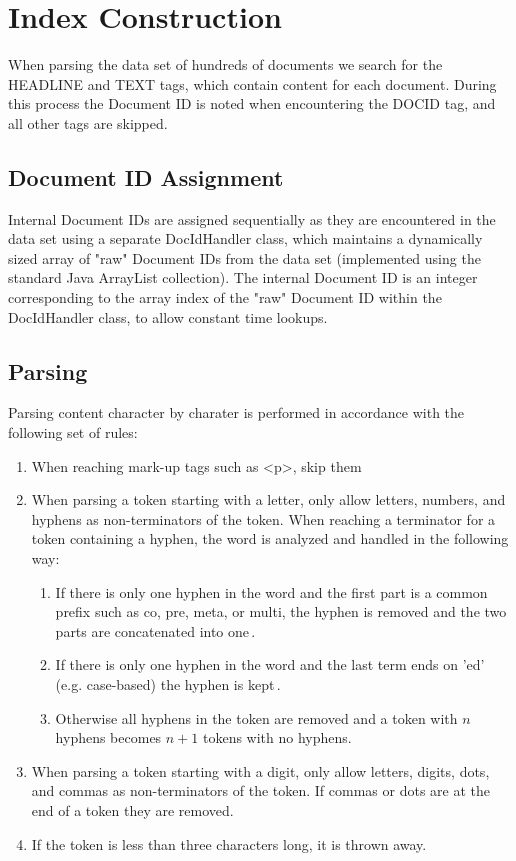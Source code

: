 
\section{Index Construction}
\label{sec:indexing}
When parsing the data set of hundreds of documents we search for the HEADLINE and TEXT tags, which contain content for each document. During this process the Document ID is noted when encountering the DOCID tag, and all other tags are skipped.

\subsection*{Document ID Assignment}

Internal Document IDs are assigned sequentially as they are encountered in the data set using a separate DocIdHandler class, which maintains a dynamically sized array of "raw" Document IDs from the data set (implemented using the standard Java ArrayList collection). The internal Document ID is an integer corresponding to the array index of the "raw" Document ID within the DocIdHandler class, to allow constant time lookups.

\subsection*{Parsing}

Parsing content character by charater is performed in accordance with the following set of rules:

\begin{enumerate}
	\item When reaching mark-up tags such as <p>, skip them
	\item When parsing a token starting with a letter, only allow letters, numbers, and hyphens as non-terminators of the token. When reaching a terminator for a token containing a hyphen, the word is analyzed and handled in the following way:
	\begin{enumerate}
		\item If there is only one hyphen in the word and the first part is a common prefix such as co, pre, meta, or multi, the hyphen is removed and the two parts are concatenated into one\,\cite{ibm13}\cite{grammar13}.
		\item If there is only one hyphen in the word and the last term ends on 'ed' (e.g. case-based) the hyphen is kept\,\cite{ibm13}.
		\item Otherwise all hyphens in the token are removed and a token with $n$ hyphens becomes $n+1$ tokens with no hyphens.
	\end{enumerate}
	\item When parsing a token starting with a digit, only allow letters, digits, dots, and commas as non-terminators of the token. If commas or dots are at the end of a token they are removed.
	\item If the token is less than three characters long, it is thrown away.
\end{enumerate}

